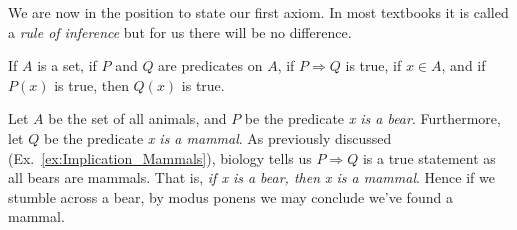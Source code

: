         We are now in the position to state our first axiom. In most textbooks
        it is called a \textit{rule of inference} but for us there will be no
        difference.
        \begin{axiom}
            \label{ax:Modus_Ponens}%
            If $A$ is a set, if $P$ and $Q$ are predicates on $A$, if
            $P\Rightarrow{Q}$ is true, if $x\in{A}$, and if $P(x)$ is
            true, then $Q(x)$ is true.
        \end{axiom}
        \begin{example}
            Let $A$ be the set of all animals, and $P$ be the predicate
            \textit{x is a bear}. Furthermore, let $Q$ be the predicate
            \textit{x is a mammal}. As previously discussed
            (Ex.~\ref{ex:Implication_Mammals}), biology tells us
            $P\Rightarrow{Q}$ is a true statement as all bears are mammals. That
            is, \textit{if x is a bear, then x is a mammal}. Hence if we stumble
            across a bear, by modus ponens we may conclude we've found a mammal.
        \end{example}
